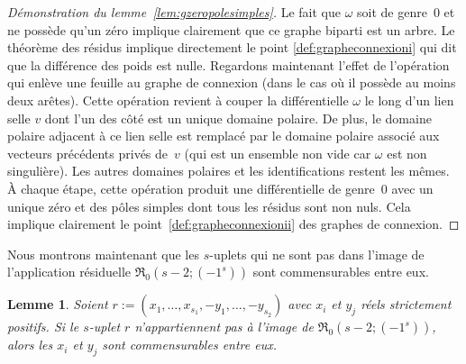 \documentclass[JEP,XML,SOM,Unicode,francais,NoFloatCountersInSection,published]{cedram}
\newcommand{\appres}[1][g]{\mathfrak{R}_{#1}}
\newtheorem{lem}[thm]{Lemme}
\theoremstyle{definition}
\begin{document}
\begin{proof}[Démonstration du lemme~\ref{lem:gzeropolesimples}]
Le fait que $\omega$ soit de genre~$0$ et ne possède qu'un zéro implique clairement que ce graphe biparti est un arbre. Le théorème des résidus implique directement le point \eqref{def:grapheconnexioni} qui dit que la différence des poids est nulle. Regardons maintenant l'effet de l'opération qui enlève une feuille au graphe de connexion (dans le cas où il possède au moins deux arêtes). Cette opération revient à couper la différentielle $\omega$ le long d'un lien selle $v$ dont l'un des côté est un unique domaine polaire. De plus, le domaine polaire adjacent à ce lien selle est remplacé par le domaine polaire associé aux vecteurs précédents privés de~$v$ (qui est un ensemble non vide car $\omega$ est non singulière). Les autres domaines polaires et les identifications restent les mêmes.
À chaque étape, cette opération produit une différentielle de genre~$0$ avec un unique zéro et des pôles simples dont tous les résidus sont non nuls. Cela implique clairement le point~\eqref{def:grapheconnexionii} des graphes de connexion.
\end{proof}

Nous montrons maintenant que les $s$-uplets qui ne sont pas dans l'image de l'application résiduelle $\appres[0](s-2;(-1^{s}))$ sont commensurables entre eux.
\begin{lem}\label{lem:finietcommens}
Soient $r:=(x_{1},\dots,x_{s_{1}},-y_{1},\dots,-y_{s_{2}})$ avec $x_{i}$ et $y_{j}$ réels strictement positifs. Si le $s$-uplet $r$ n'appartiennent pas à l'image de $\appres[0](s-2;(-1^{s}))$, alors les $x_{i}$ et $y_{j}$ sont commensurables entre eux.
\end{lem}
\end{document}
